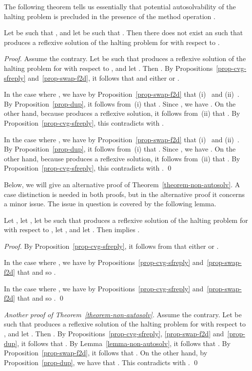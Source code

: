 \documentclass[fleqn]{llncs}
\begin{document}
The following theorem tells us essentially that potential
autosolvability of the halting problem is precluded in the presence of
the method operation .
\begin{theorem}
\label{theorem-non-autosolv}
Let  be such that , and
let  be such that .
Then there does not exist an  such that 
produces a reflexive solution of the halting problem for  with
respect to .
\end{theorem}
\begin{proof}
Assume the contrary.
Let  be such that  produces a re\-flexive
solution of the halting problem for  with respect to , and
let .
Then .
By Propositions~\ref{prop-cvg-sfreply} and~\ref{prop-swap-f2d}, it
fol\-lows that 
and either
 or
.

In the case where
,
we have by Proposition~\ref{prop-swap-f2d} that
(i)~ and
(ii)~.
By Proposition~\ref{prop-dup}, it follows from~(i) that
.
Since , we have
.
On the other hand, because  produces a reflexive solution, it follows
from~(ii) that .
By Proposition~\ref{prop-cvg-sfreply}, this contradicts with
.

In the case where
,
we have by Proposition~\ref{prop-swap-f2d} that
(i)~ and
(ii)~.
By Proposition~\ref{prop-dup}, it follows from~(i) that
.
Since , we have
.
On the other hand, because  produces a reflexive solution, it follows
from~(ii) that .
By Proposition~\ref{prop-cvg-sfreply}, this contradicts with
.
\qed
\end{proof}

Below, we will give an alternative proof of
Theorem~\ref{theorem-non-autosolv}.
A case distinction is needed in both proofs, but in the alternative
proof it concerns a minor issue.
The issue in question is covered by the following lemma.
\begin{lemma}
\label{lemma-non-autosolv}
Let , let ,
let  be such that  produces a reflexive solution
of the halting problem for  with respect to ,
let , and let .
Then
 implies
.
\end{lemma}
\begin{proof}
By Proposition~\ref{prop-cvg-sfreply}, it follows from
 that either
 or
.

In the case where , we have
by Propositions~\ref{prop-cvg-sfreply} and~\ref{prop-swap-f2d} that
 and so
.

In the case where , we have
by Propositions~\ref{prop-cvg-sfreply} and~\ref{prop-swap-f2d} that
 and so
.
\qed
\end{proof}

\begin{trivlist}
\item
\emph{Another proof of Theorem~\ref{theorem-non-autosolv}.}
Assume the contrary.
Let  be such that  produces a reflexive solution
of the halting problem for  with re\-spect to , and
let .
Then .
By Propo\-sitions~\ref{prop-cvg-sfreply}, \ref{prop-swap-f2d}
and~\ref{prop-dup}, it follows that
.
By Lemma~\ref{lemma-non-autosolv}, it follows that
.
By Proposition~\ref{prop-swap-f2d}, it follows that
.
On the other hand, by Propo\-sition~\ref{prop-dup}, we have that
.
This contradicts with
.
\qed
\end{trivlist}
\end{document}
